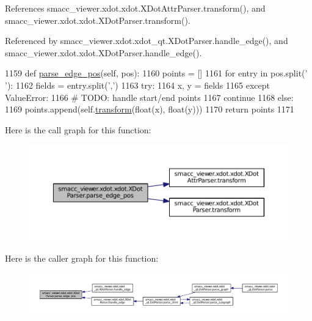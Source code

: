 References smacc\+\_\+viewer.\+xdot.\+xdot.\+X\+Dot\+Attr\+Parser.\+transform(), and smacc\+\_\+viewer.\+xdot.\+xdot.\+X\+Dot\+Parser.\+transform().



Referenced by smacc\+\_\+viewer.\+xdot.\+xdot\+\_\+qt.\+X\+Dot\+Parser.\+handle\+\_\+edge(), and smacc\+\_\+viewer.\+xdot.\+xdot.\+X\+Dot\+Parser.\+handle\+\_\+edge().


\begin{DoxyCode}
1159     \textcolor{keyword}{def }\hyperlink{classsmacc__viewer_1_1xdot_1_1xdot_1_1XDotParser_a197eeb6847d6621e4174b4f438a961c8}{parse\_edge\_pos}(self, pos):
1160         points = []
1161         \textcolor{keywordflow}{for} entry \textcolor{keywordflow}{in} pos.split(\textcolor{stringliteral}{' '}):
1162             fields = entry.split(\textcolor{stringliteral}{','})
1163             \textcolor{keywordflow}{try}:
1164                 x, y = fields
1165             \textcolor{keywordflow}{except} ValueError:
1166                 \textcolor{comment}{# TODO: handle start/end points}
1167                 \textcolor{keywordflow}{continue}
1168             \textcolor{keywordflow}{else}:
1169                 points.append(self.\hyperlink{classsmacc__viewer_1_1xdot_1_1xdot_1_1XDotParser_a490b6dcfb3944af0d6d691f1aa25db54}{transform}(float(x), float(y)))
1170         \textcolor{keywordflow}{return} points
1171 
\end{DoxyCode}


Here is the call graph for this function\+:
\nopagebreak
\begin{figure}[H]
\begin{center}
\leavevmode
\includegraphics[width=350pt]{classsmacc__viewer_1_1xdot_1_1xdot_1_1XDotParser_a197eeb6847d6621e4174b4f438a961c8_cgraph}
\end{center}
\end{figure}




Here is the caller graph for this function\+:
\nopagebreak
\begin{figure}[H]
\begin{center}
\leavevmode
\includegraphics[width=350pt]{classsmacc__viewer_1_1xdot_1_1xdot_1_1XDotParser_a197eeb6847d6621e4174b4f438a961c8_icgraph}
\end{center}
\end{figure}


